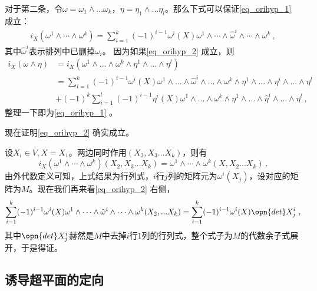 对于第二条，令$\omega=\omega_1\wedge...\omega_k$，$\eta=\eta_1\wedge...\eta_l$。那么下式可以保证\autoref{eq_orihyp_1} 成立：
\begin{equation}\label{eq_orihyp_2}
\begin{aligned}
i_X(\omega^1\wedge\cdots\wedge\omega^k)=\sum_{i=1}^k(-1)^{i-1}\omega^i(X)\omega^1\wedge\cdots\wedge\hat{\omega}^i\wedge\cdots\wedge\omega^k~,
\end{aligned}
\end{equation}
其中$\hat\omega^i$表示排列中已删掉$\omega_i$。
因为如果\autoref{eq_orihyp_2} 成立，则
\begin{equation}
\begin{aligned}
i_X(\omega\wedge\eta)&=i_X(\omega^1\wedge...\wedge\omega^k\wedge\eta^1\wedge...\wedge\eta^l)\\
&=\sum_{i=1}^k(-1)^{i-1}\omega^{i}(X)\omega^1\wedge...\wedge\hat\omega^i\wedge...\wedge\omega^k\wedge\eta^1\wedge...\wedge\eta^i\wedge...\wedge\eta^l\\
&+(-1)^k\sum_{i=1}^l(-1)^{i-1}\eta^{i}(X)\omega^1\wedge...\wedge\omega^k\wedge\eta^1\wedge...\wedge\hat\eta^i\wedge...\wedge\eta^l~,
\end{aligned}
\end{equation}
整理一下即为\autoref{eq_orihyp_1} 。

现在证明\autoref{eq_orihyp_2} 确实成立。

设$X_i\in V,X=X_1$。两边同时作用$(X_2,X_3...X_k)$，则有
\begin{equation}
i_X(\omega^1\wedge\cdots\wedge\omega^k)(X_2,X_3...X_k)=\omega^1\wedge\cdots\wedge\omega^k(X,X_2...X_k)~.
\end{equation}
由外代数定义可知，上式结果为行列式，$i$行$j$列的矩阵元为$\omega^i(X_j)$，设对应的矩阵为$M$。现在我们再来看\autoref{eq_orihyp_2} 右侧，
\begin{equation}
\begin{aligned}
\sum_{i=1}^k(-1)^{i-1} \omega^i(X) \omega^1 \wedge \cdots \wedge \hat{\omega}^i \wedge \cdots \wedge \omega^k(X_2,...X_k)=\sum_{i=1}^k(-1)^{i-1} \omega^i(X) \opn{det}X^i_j~,
\end{aligned}
\end{equation}
其中$\opn{det}X^i_j$赫然是$M$中去掉$i$行$1$列的行列式，整个式子为$M$的代数余子式展开，于是得证。
\subsection{诱导超平面的定向}